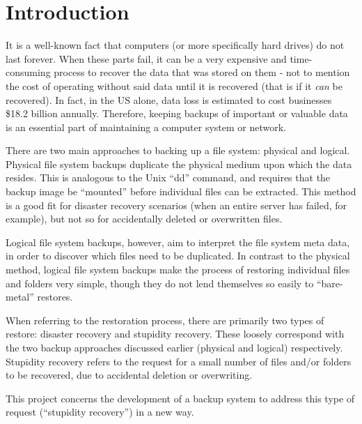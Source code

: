 \chapter{Introduction}

It is a well-known fact that computers (or more specifically hard drives) do
not last forever. When these parts fail, it can be a very expensive and
time-consuming process to recover the data that was stored on them - not to
mention the cost of operating without said data until it is recovered (that is
if it \emph{can} be recovered). In fact, in the US alone, data loss is
estimated to cost businesses \$18.2 billion annually\cite{smith03}. Therefore,
keeping backups of important or valuable data is an essential part of
maintaining a computer system or network.

There are two main approaches to backing up a file system: physical and
logical\cite{hutchinson99}. Physical file system backups duplicate the physical
medium upon which the data resides. This is analogous to the Unix ``dd''
command, and requires that the backup image be ``mounted'' before individual
files can be extracted. This method is a good fit for disaster recovery
scenarios (when an entire server has failed, for example), but not so for
accidentally deleted or overwritten files.

Logical file system backups, however, aim to interpret the file system meta
data, in order to discover which files need to be duplicated.  In contrast to
the physical method, logical file system backups make the process of restoring
individual files and folders very simple, though they do not lend themselves so
easily to ``bare-metal'' restores.

When referring to the restoration process, there are primarily two types of
restore: disaster recovery and stupidity recovery\cite{hutchinson99}. These
loosely correspond with the two backup approaches discussed earlier (physical
and logical) respectively. Stupidity recovery refers to the request for a small
number of files and/or folders to be recovered, due to accidental deletion or
overwriting.

This project concerns the development of a backup system to address this type
of request (``stupidity recovery'') in a new way.
